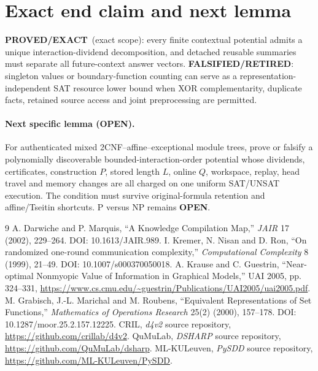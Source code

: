 \documentclass[11pt]{article}
\newcommand{\PROVED}{\textbf{PROVED/EXACT}}
\newcommand{\OPEN}{\textbf{OPEN}}
\newcommand{\FALSIFIED}{\textbf{FALSIFIED/RETIRED}}
\begin{document}
\section{Exact end claim and next lemma}
\PROVED\ (exact scope): every finite contextual potential admits a unique
interaction-dividend decomposition, and detached reusable summaries must
separate all future-context answer vectors.  \FALSIFIED: singleton values or
boundary-function counting can serve as a representation-independent SAT
resource lower bound when XOR complementarity, duplicate facts, retained
source access and joint preprocessing are permitted.

\paragraph{Next specific lemma (OPEN).}
For authenticated mixed 2CNF--affine--exceptional module trees, prove or
falsify a polynomially discoverable bounded-interaction-order potential whose
dividends, certificates, construction $P$, stored length $L$, online $Q$,
workspace, replay, head travel and memory changes are all charged on one
uniform SAT/UNSAT execution.  The condition must survive original-formula
retention and affine/Tseitin shortcuts.  P versus NP remains \OPEN.

\begin{thebibliography}{9}
 A. Darwiche and P. Marquis, ``A Knowledge Compilation Map,''
\emph{JAIR} 17 (2002), 229--264. DOI: 10.1613/JAIR.989.
 I. Kremer, N. Nisan and D. Ron, ``On randomized one-round
communication complexity,'' \emph{Computational Complexity} 8 (1999), 21--49.
DOI: 10.1007/s000370050018.
 A. Krause and C. Guestrin, ``Near-optimal Nonmyopic Value of
Information in Graphical Models,'' UAI 2005, pp. 324--331,
\url{https://www.cs.cmu.edu/~guestrin/Publications/UAI2005/uai2005.pdf}.
 M. Grabisch, J.-L. Marichal and M. Roubens, ``Equivalent
Representations of Set Functions,'' \emph{Mathematics of Operations Research}
25(2) (2000), 157--178. DOI: 10.1287/moor.25.2.157.12225.
 CRIL, \emph{d4v2} source repository,
\url{https://github.com/crillab/d4v2}.
 QuMuLab, \emph{DSHARP} source repository,
\url{https://github.com/QuMuLab/dsharp}.
 ML-KULeuven, \emph{PySDD} source repository,
\url{https://github.com/ML-KULeuven/PySDD}.
\end{thebibliography}

\end{document}
